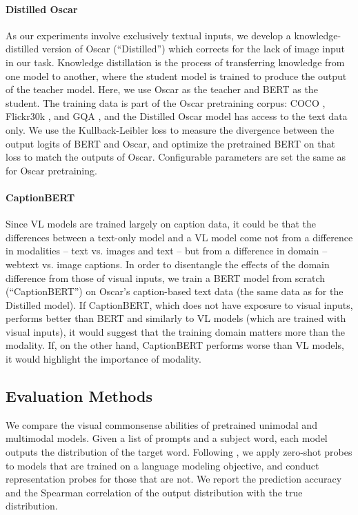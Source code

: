 \documentclass[11pt]{article}
\begin{document}
\paragraph{Distilled Oscar}
As our experiments involve exclusively textual inputs, we develop a knowledge-distilled version of Oscar (``Distilled'') which corrects for the lack of image input in our task.
Knowledge distillation \citep{hinton2015distilling, distil_bert} is the process of transferring knowledge from one model to another, where the student model is trained to produce the output of the teacher model. Here, we use Oscar as the teacher and BERT as the student.
The training data is part of the Oscar pretraining corpus: COCO \citep{coco}, Flickr30k \citep{flickr30k}, and GQA \citep{gqa}, and the Distilled Oscar model has access to the text data only.
We use the Kullback-Leibler loss to measure the divergence between the output logits of BERT and Oscar, and optimize the pretrained BERT on that loss to match the outputs of Oscar. Configurable parameters are set the same as for Oscar pretraining.

\paragraph{CaptionBERT}
Since VL models are trained largely on caption data, it could be that the differences between a text-only model and a VL model come not from a difference in modalities -- text vs. images and text -- but from a difference in domain -- webtext vs. image captions.
In order to disentangle the effects of the domain difference from those of visual inputs, we train a BERT model from scratch (``CaptionBERT'') on Oscar's caption-based text data (the same data as for the Distilled model). 
If CaptionBERT, which does not have exposure to visual inputs, performs better than BERT and similarly to VL models (which are trained with visual inputs), it would suggest that the training domain matters more than the modality.
If, on the other hand, CaptionBERT performs worse than VL models, it would highlight the importance of modality. 


\subsection{Evaluation Methods} \label{sec:eval}
We compare the visual commonsense abilities of pretrained unimodal and multimodal models.
Given a list of prompts and a subject word, each model outputs the distribution of the target word.
Following \citet{paik-etal-2021-world}, we apply zero-shot probes to models that are trained on a language modeling objective, and conduct representation probes for those that are not. We report the prediction accuracy and the Spearman correlation of the output distribution with the true distribution.
\end{document}
